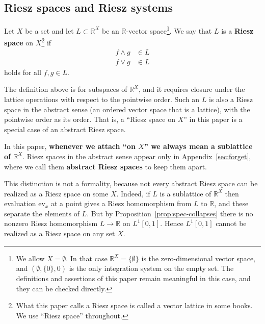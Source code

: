 \subsection{Riesz spaces and Riesz systems}

\begin{definition}
  Let $X$ be a set and let $L\subset\mathbb{R}^X$ be an
  $\mathbb{R}$-vector space\footnote{
    We allow $X=\emptyset$. In that case $\mathbb{R}^X=\{\emptyset\}$ is the
    zero-dimensional vector space, and $(\emptyset,\{0\},0)$ is the only
    integration system on the empty set.
    The definitions and assertions of this paper remain meaningful in this case,
    and they can be checked directly.
  }.
  We say that $L$ is a \textbf{Riesz space} on $X$\footnote{
    What this paper calls a Riesz space is called a vector lattice in some books.
    We use ``Riesz space'' throughout.
  } if
  \begin{align*}
    f\land g &\in L \\
    f\lor g &\in L
  \end{align*}
  holds for all $f,g\in L$.
\end{definition}

\begin{remark}[on terminology]\label{rem:riesz-terminology}
  The definition above is for subspaces of $\mathbb{R}^X$, and it requires
  closure under the lattice operations with respect to the pointwise order.
  Such an $L$ is also a Riesz space in the abstract sense (an ordered vector
  space that is a lattice), with the pointwise order as its order.
  That is, a ``Riesz space on $X$'' in this paper is a special case of an
  abstract Riesz space.

  In this paper, \textbf{whenever we attach ``on $X$'' we always mean a
  sublattice of $\mathbb{R}^X$}.
  Riesz spaces in the abstract sense appear only in
  Appendix~\ref{sec:forget}, where we call them \textbf{abstract Riesz spaces}
  to keep them apart.

  This distinction is not a formality, because not every abstract Riesz space can
  be realized as a Riesz space on some $X$.
  Indeed, if $L$ is a sublattice of $\mathbb{R}^X$ then evaluation
  $\mathrm{ev}_x$ at a point gives a Riesz homomorphism from $L$ to $\mathbb{R}$,
  and these separate the elements of $L$.
  But by Proposition~\ref{prop:spec-collapses} there is no nonzero Riesz
  homomorphism $L\to\mathbb{R}$ on $L^1[0,1]$.
  Hence $L^1[0,1]$ cannot be realized as a Riesz space on any set $X$.
\end{remark}

